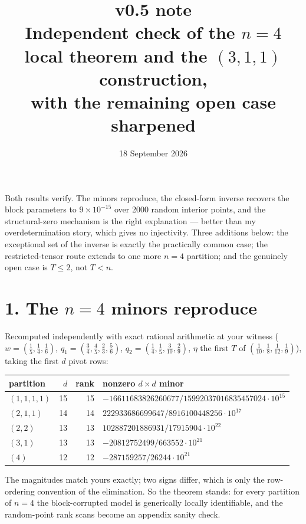 \documentclass[11pt]{article}
\title{\textbf{v0.5 note}\\[2pt]
\large Independent check of the $n=4$ local theorem and the $(3,1,1)$ construction,\\
with the remaining open case sharpened}
\author{18 September 2026}
\date{}
\theoremstyle{remark}
\begin{document}
\maketitle
\vspace{-2.5em}

Both results verify. The minors reproduce, the closed-form inverse recovers the block parameters to $9\times10^{-15}$ over 2000 random interior points, and the structural-zero mechanism is the right explanation --- better than my overdetermination story, which gives no injectivity. Three additions below: the exceptional set of the inverse is exactly the practically common case; the restricted-tensor route extends to one more $n=4$ partition; and the genuinely open case is $T\le2$, not $T<n$.

\section*{1. The $n=4$ minors reproduce}

Recomputed independently with exact rational arithmetic at your witness ($w=(\frac15,\frac14,\frac16)$, $q_1=(\frac34,\frac45,\frac23,\frac56)$, $q_2=(\frac14,\frac15,\frac3{10},\frac29)$, $\eta$ the first $T$ of $(\frac1{10},\frac18,\frac1{12},\frac19)$), taking the first $d$ pivot rows:

\begin{center}\small
\begin{tabular}{@{}lrrl@{}}
\toprule
partition & $d$ & rank & nonzero $d\times d$ minor\\
\midrule
$(1,1,1,1)$ & 15 & 15 & $-16611683826260677/15992037016835457024\cdot10^{15}$\\
$(2,1,1)$ & 14 & 14 & $222933686699647/8916100448256\cdot10^{17}$\\
$(2,2)$ & 13 & 13 & $102887201886931/17915904\cdot10^{22}$\\
$(3,1)$ & 13 & 13 & $-20812752499/663552\cdot10^{21}$\\
$(4)$ & 12 & 12 & $-287159257/26244\cdot10^{21}$\\
\bottomrule
\end{tabular}
\end{center}

The magnitudes match yours exactly; two signs differ, which is only the row-ordering convention of the elimination. So the theorem stands: for every partition of $n=4$ the block-corrupted model is generically locally identifiable, and the random-point rank scans become an appendix sanity check.
\end{document}
